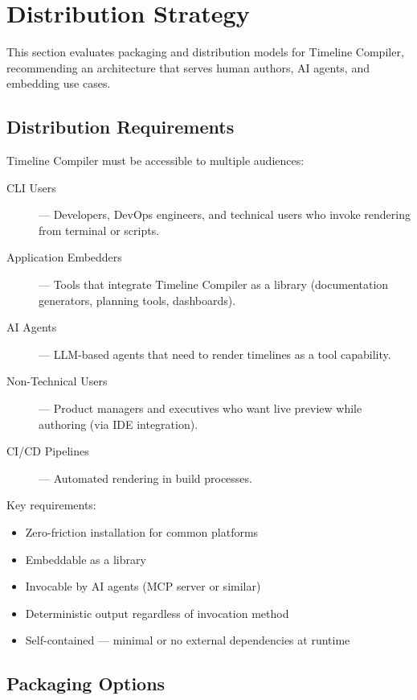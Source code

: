 \section{Distribution Strategy}
\label{sec:distribution}

This section evaluates packaging and distribution models for Timeline Compiler, recommending an architecture that serves human authors, AI agents, and embedding use cases.

\subsection{Distribution Requirements}

Timeline Compiler must be accessible to multiple audiences:

\begin{description}
  \item[CLI Users] — Developers, DevOps engineers, and technical users who invoke rendering from terminal or scripts.
  
  \item[Application Embedders] — Tools that integrate Timeline Compiler as a library (documentation generators, planning tools, dashboards).
  
  \item[AI Agents] — LLM-based agents that need to render timelines as a tool capability.
  
  \item[Non-Technical Users] — Product managers and executives who want live preview while authoring (via IDE integration).
  
  \item[CI/CD Pipelines] — Automated rendering in build processes.
\end{description}

Key requirements:
\begin{itemize}
  \item Zero-friction installation for common platforms
  \item Embeddable as a library
  \item Invocable by AI agents (MCP server or similar)
  \item Deterministic output regardless of invocation method
  \item Self-contained — minimal or no external dependencies at runtime
\end{itemize}

\subsection{Packaging Options}


